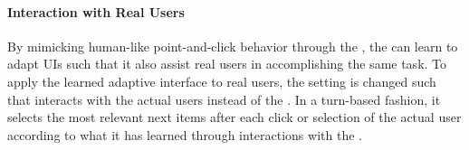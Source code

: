 
\paragraph*{Interaction with Real Users}
By mimicking human-like point-and-click behavior through the \useragent, the \interfaceagent can learn to adapt UIs such that it also assist real users in accomplishing the same task.
To apply the learned adaptive interface to real users, the setting is changed such that \interfaceagent interacts with the actual users instead of the \useragent. 
In a turn-based fashion, it selects the most relevant next items after each click or selection of the actual user according to what it has learned through interactions with the \useragent.

    
